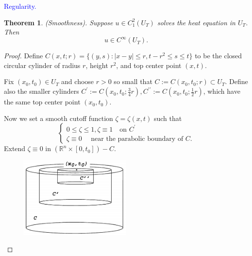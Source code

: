 \documentclass[hyperref,UTF8,12pt]{article}
\numberwithin{equation}{subsection}
\theoremstyle{plain}
\newtheorem{theorem}{Theorem}
\theoremstyle{definition}
\numberwithin{theorem}{section}
\numberwithin{lemma}{section}
\numberwithin{proposition}{section}
\numberwithin{remark}{section}
\numberwithin{corollary}{section}
\numberwithin{definition}{section}
\numberwithin{problem}{section}
\numberwithin{example}{section}
\newcommand{\mr}{\mathbb{R}}
\renewcommand{\leq}{\leqslant}
\begin{document}
\noindent\textcolor{blue}{Regularity.}
\begin{theorem}\label{thm2.25}
(Smoothness). Suppose $u\in C_1^2(U_T)$ solves the heat equation in $U_T$. Then\[u\in C^\infty(U_T).\]
\end{theorem}
\begin{proof}
Define $C(x,t;r)=\{(y,s):|x-y|\leq r,t-r^2\leq s\leq t\}$ to be the closed circular cylinder of radius $r$, height $r^2$, and top center point $(x,t)$.

Fix $(x_0,t_0)\in U_T$ and choose $r>0$ so small that $C:=C(x_0,t_0;r)\subset U_T$. Define also the smaller cylinders $C^\prime:=C(x_0,t_0;\frac{3}{4}r),C^{\prime\prime}:= C(x_0,t_0;\frac{1}{2}r)$, which have the same top center point $(x_0,t_0)$.

Now we set a smooth cutoff function $\zeta=\zeta(x,t)$ such that\[\left\{\begin{array}{l}
	0\leq\zeta\leq1,\zeta\equiv1\quad\text{on } C^\prime\\
	\zeta\equiv0\quad\text{ near the parabolic boundary of } C.
\end{array}\right.\]Extend $\zeta\equiv0$ in $(\mr^n\times[0,t_0])-C$.
\begin{figure}[h]
	\centering
	\includegraphics[width=0.5\textwidth]{cylinder.png}
\end{figure}


\end{proof}
\end{document}
